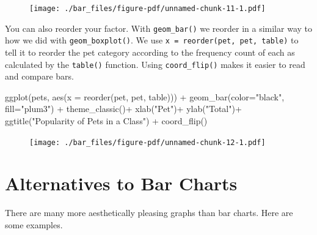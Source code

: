 \documentclass[
  letterpaper,
  DIV=11,
  numbers=noendperiod]{scrreprt}
\newenvironment{Shaded}{\begin{snugshade}}{\end{snugshade}}
\newcommand{\AttributeTok}[1]{\textcolor[rgb]{0.40,0.45,0.13}{#1}}
\newcommand{\FunctionTok}[1]{\textcolor[rgb]{0.28,0.35,0.67}{#1}}
\newcommand{\NormalTok}[1]{\textcolor[rgb]{0.00,0.23,0.31}{#1}}
\newcommand{\SpecialCharTok}[1]{\textcolor[rgb]{0.37,0.37,0.37}{#1}}
\newcommand{\StringTok}[1]{\textcolor[rgb]{0.13,0.47,0.30}{#1}}
\begin{document}
\begin{figure}[H]

{\centering \texttt{[image: ./bar\_files/figure-pdf/unnamed-chunk-11-1.pdf]}

}

\end{figure}

You can also reorder your factor. With \texttt{geom\_bar()} we reorder
in a similar way to how we did with \texttt{geom\_boxplot()}. We use
\texttt{x\ =\ reorder(pet,\ pet,\ table)} to tell it to reorder the pet
category according to the frequency count of each as calculated by the
\texttt{table()} function. Using \texttt{coord\_flip()} makes it easier
to read and compare bars.

\begin{Shaded}
\begin{Highlighting}[]
\FunctionTok{ggplot}\NormalTok{(pets, }\FunctionTok{aes}\NormalTok{(}\AttributeTok{x =} \FunctionTok{reorder}\NormalTok{(pet, pet, table))) }\SpecialCharTok{+} 
  \FunctionTok{geom\_bar}\NormalTok{(}\AttributeTok{color=}\StringTok{"black"}\NormalTok{, }\AttributeTok{fill=}\StringTok{"plum3"}\NormalTok{) }\SpecialCharTok{+}
  \FunctionTok{theme\_classic}\NormalTok{()}\SpecialCharTok{+}
  \FunctionTok{xlab}\NormalTok{(}\StringTok{"Pet"}\NormalTok{)}\SpecialCharTok{+}
  \FunctionTok{ylab}\NormalTok{(}\StringTok{"Total"}\NormalTok{)}\SpecialCharTok{+}
  \FunctionTok{ggtitle}\NormalTok{(}\StringTok{"Popularity of Pets in a Class"}\NormalTok{) }\SpecialCharTok{+}
  \FunctionTok{coord\_flip}\NormalTok{()}
\end{Highlighting}
\end{Shaded}

\begin{figure}[H]

{\centering \texttt{[image: ./bar\_files/figure-pdf/unnamed-chunk-12-1.pdf]}

}

\end{figure}


\hypertarget{alternatives-to-bar-charts}{%
\chapter{Alternatives to Bar Charts}\label{alternatives-to-bar-charts}}

There are many more aesthetically pleasing graphs than bar charts. Here
are some examples.
\end{document}

